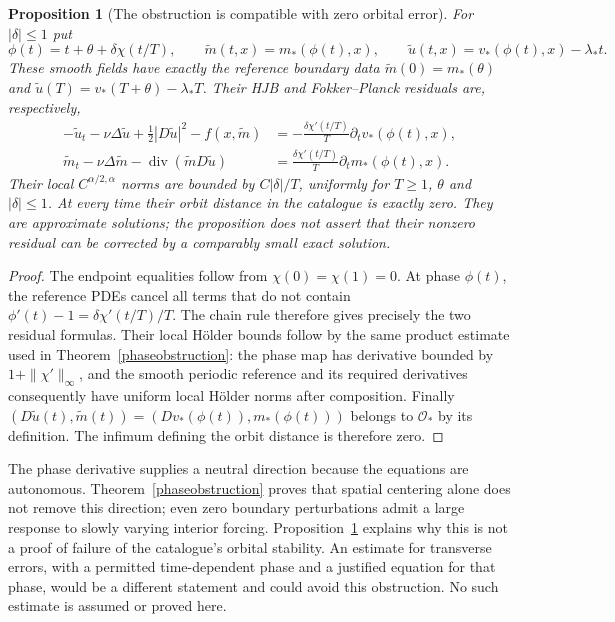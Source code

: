 \documentclass[11pt]{article}
\newtheorem{proposition}[theorem]{Proposition}
\DeclareMathOperator{\diver}{div}
\begin{document}
\begin{proposition}[The obstruction is compatible with zero orbital error]
\label{nonlinearmodulation}
For $|\delta|\leq1$ put
\[
 \phi(t)=t+\theta+\delta\chi(t/T),\qquad
 \widetilde m(t,x)=m_*(\phi(t),x),\qquad
 \widetilde u(t,x)=v_*(\phi(t),x)-\lambda_*t.
\]
These smooth fields have exactly the reference boundary data
$\widetilde m(0)=m_*(\theta)$ and
$\widetilde u(T)=v_*(T+\theta)-\lambda_*T$.
Their HJB and Fokker--Planck residuals are, respectively,
\begin{align*}
 -\widetilde u_t-\nu\Delta\widetilde u
    +\tfrac12|D\widetilde u|^2-f(x,\widetilde m)
 &=-\frac{\delta\chi'(t/T)}T\partial_t v_*(\phi(t),x),\\
 \widetilde m_t-\nu\Delta\widetilde m
              -\diver(\widetilde m D\widetilde u)
 &=\frac{\delta\chi'(t/T)}T\partial_t m_*(\phi(t),x).
\end{align*}
Their local $C^{\alpha/2,\alpha}$ norms are bounded by
$C|\delta|/T$, uniformly for $T\geq1$, $\theta$ and $|\delta|\leq1$.
At every time their orbit distance in the catalogue is exactly zero.
They are approximate solutions; the proposition does not assert that
their nonzero residual can be corrected by a comparably small exact
solution.
\end{proposition}
\begin{proof}
The endpoint equalities follow from $\chi(0)=\chi(1)=0$.
At phase $\phi(t)$, the reference PDEs cancel all terms that do not
contain $\phi'(t)-1=\delta\chi'(t/T)/T$. The chain rule therefore
gives precisely the two residual formulas. Their local H\"older bounds
follow by the same product estimate used in
Theorem~\ref{phaseobstruction}: the phase map has derivative bounded
by $1+\|\chi'\|_\infty$, and the smooth periodic reference and its
required derivatives consequently have uniform local H\"older norms
after composition. Finally
$(D\widetilde u(t),\widetilde m(t))=
(Dv_*(\phi(t)),m_*(\phi(t)))$ belongs to $\mathcal O_*$ by its
definition. The infimum defining the orbit distance is therefore zero.
\end{proof}

The phase derivative supplies a neutral direction because the equations
are autonomous. Theorem~\ref{phaseobstruction} proves that spatial
centering alone does not remove this direction; even zero boundary
perturbations admit a large response to slowly varying interior forcing.
Proposition~\ref{nonlinearmodulation} explains why this is not a proof
of failure of the catalogue's orbital stability. An estimate for
transverse errors, with a permitted time-dependent phase and a justified
equation for that phase, would be a different statement and could avoid
this obstruction. No such estimate is assumed or proved here.
\end{document}
